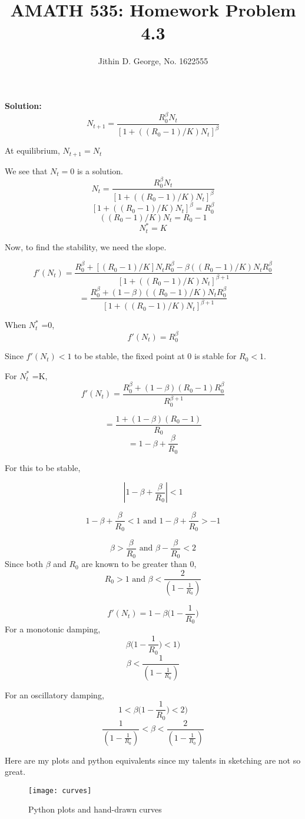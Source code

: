 \documentclass[a4paper,12pt]{article}
\title{\normalsize AMATH 535: Homework Problem 4.3}
\author{\normalsize Jithin D. George, No. 1622555}
\begin{document}
\maketitle
	
{\bf 	} 



{\bf Solution:	}
\[N_{t+1}= \frac{R_0^\beta N_t}{[1+ ((R_0-1)/K) N_t]^\beta}\]


At equilibrium, $N_{t+1}=N_t$

We see that $N_t =0$ is a solution.
\[N_{t}= \frac{R_0^\beta N_t}{[1+ ((R_0-1)/K) N_t]^\beta}\]
\[[1+ ((R_0-1)/K) N_t]^\beta=R_0^\beta \]
\[ ((R_0-1)/K) N_t=R_0-1\]
\[N_t^*=K\]

Now, to find the stability, we need the slope.

\[ f' (N_t)= \frac{R_0^\beta+ [(R_0-1)/K] N_tR_0^\beta  - \beta((R_0-1)/K) N_tR_0^\beta  }{[1+ ((R_0-1)/K) N_t]^{\beta+1}}\]
\[ = \frac{R_0^\beta +(1 - \beta)((R_0-1)/K) N_tR_0^\beta  }{[1+ ((R_0-1)/K) N_t]^{\beta+1}} \]

When $N_t^*$ =0,
\[ f' (N_t)= R_0^\beta\]

Since $ f' (N_t) < 1 $ to be stable, the fixed point at 0 is stable for $R_0 < 1$.

For $N_t^*$ =K,
\[ f' (N_t) = \frac{R_0^\beta +(1 - \beta)(R_0-1) R_0^\beta  }{R_0^{\beta+1}}\]

\[ = \frac{1 +(1 - \beta)(R_0-1)  }{R_0}\]
\[ = 1-\beta +\frac{\beta}{R_0}\]

For this to be stable,

\[| 1-\beta +\frac{\beta}{R_0}| <1\]

\[ 1-\beta +\frac{\beta}{R_0} <1 \text{ and } 1-\beta +\frac{\beta}{R_0} >-1\]

\[ \beta >\frac{\beta}{R_0}  \text{ and } \beta -\frac{\beta}{R_0} <2\]
Since both $\beta $ and $R_0$ are known to be greater than 0,
\[ R_0 >1  \text{ and } \beta  <\frac{2}{(1-\frac{1}{R_0})}\]

\[ f' (N_t) = 1-\beta\big(1-\frac{1}{R_0}\big)\]
For a monotonic damping,
\[\beta\big(1-\frac{1}{R_0}\big) <1)\]
\[\beta <\frac{1}{(1-\frac{1}{R_0})}\]

For an oscillatory damping,
\[1<\beta\big(1-\frac{1}{R_0}\big) <2)\]
\[\frac{1}{(1-\frac{1}{R_0})}<\beta <\frac{2}{(1-\frac{1}{R_0})}\]

Here are my plots and python equivalents since my talents in sketching are not so great.
 
\begin{figure}[H] 
	
	\texttt{[image: curves]}
	\caption{Python plots and hand-drawn curves}
\end{figure}
\end{document}
